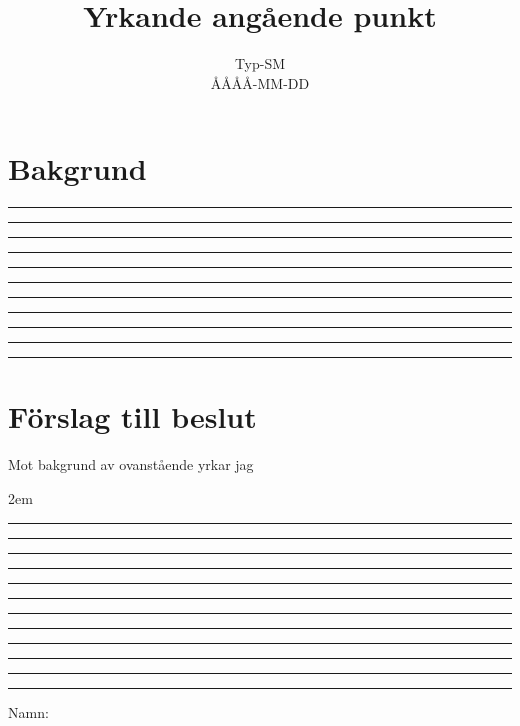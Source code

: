 \documentclass[a4paper]{article}
\title{Yrkande angående punkt \hspace{0cm} \makebox[1in]{\hrulefill}}
\date{Typ-SM \\ ÅÅÅÅ-MM-DD} %
\begin{document}
\maketitle

\pagestyle{empty}
\thispagestyle{empty}

\section*{Bakgrund}
\rule{15cm}{0.01cm}
\rule[-0.2cm]{15cm}{0.01cm}
\rule[-0.4cm]{15cm}{0.01cm}
\rule[-0.6cm]{15cm}{0.01cm}
\rule[-0.6cm]{15cm}{0.01cm}
\rule[-0.6cm]{15cm}{0.01cm}
\rule[-0.6cm]{15cm}{0.01cm}
\rule[-0.6cm]{15cm}{0.01cm}
\rule[-0.6cm]{15cm}{0.01cm}
\rule[-0.6cm]{15cm}{0.01cm}
\rule[-0.6cm]{15cm}{0.01cm}

\section*{Förslag till beslut}
Mot bakgrund av ovanstående yrkar jag

\begin{list}{\bf att}{} \itemsep2em
\item \rule{14cm}{0.01cm}
\rule[-0.2cm]{14cm}{0.01cm}
\rule[-0.4cm]{14cm}{0.01cm}
\rule[-0.6cm]{14cm}{0.01cm}
\item \rule{14cm}{0.01cm}
\rule[-0.2cm]{14cm}{0.01cm}
\rule[-0.4cm]{14cm}{0.01cm}
\rule[-0.6cm]{14cm}{0.01cm}
\item \rule{14cm}{0.01cm}
\rule[-0.2cm]{14cm}{0.01cm}
\rule[-0.4cm]{14cm}{0.01cm}
\rule[-0.6cm]{14cm}{0.01cm}
\end{list}

\vspace{2cm}
Namn: \hspace{0cm} \makebox[3in]{\hrulefill}
\end{document}
